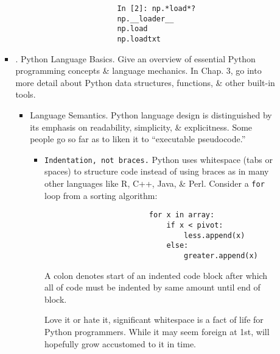 \documentclass{article}
\begin{document}
\begin{enumerate}
\begin{itemize}
\begin{itemize}
\begin{itemize}
\begin{verbatim}
					In [2]: np.*load*?
					np.__loader__
					np.load
					np.loadtxt
				\end{verbatim}
			\end{itemize}
			\item {. Python Language Basics.} Give an overview of essential Python programming concepts \& language mechanics. In Chap. 3, go into more detail about Python data structures, functions, \& other built-in tools.
			\begin{itemize}
				\item {\sf Language Semantics.} Python language design is distinguished by its emphasis on readability, simplicity, \& explicitness. Some people go so far as to liken it to ``executable pseudocode.''
				\begin{itemize}
					\item {\tt Indentation, not braces.} Python uses whitespace (tabs or spaces) to structure code instead of using braces as in many other languages like R, C++, Java, \& Perl. Consider a {\tt for} loop from a sorting algorithm:
					\begin{verbatim}
						for x in array:
						    if x < pivot:
						        less.append(x)
						    else:
						        greater.append(x)
					\end{verbatim}
					A colon denotes start of an indented code block after which all of code must be indented by same amount until end of block.
					
					Love it or hate it, significant whitespace is a fact of life for Python programmers. While it may seem foreign at 1st, will hopefully grow accustomed to it in time.
					

\end{itemize}
\end{itemize}
\end{itemize}
\end{itemize}
\end{enumerate}
\end{document}
